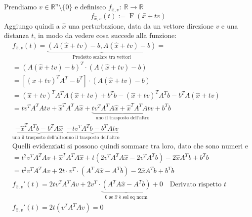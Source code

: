 \documentclass{article}
\begin{document}
Prendiamo $v\in \mathbb R^n\setminus\{0\}$ e definisco $f_{\widehat{x},v}:\ \mathbb R\to\mathbb R$
\[f_{\widehat{x},v}(t):=\operatorname{F}(\widehat{x}+tv)\]
Aggiungo quindi a $\widehat{x}$ una perturbazione, data da un vettore direzione $v$ e una distanza $t$, in modo da vedere cosa succede alla funzione:
\begin{align*}
     & f_{\widehat{x},v}(t)=\underbrace{\left(A\left(\widehat{x}+tv\right)-b, A\left(\widehat{x}+tv\right)-b\right)}_{\text{Prodotto scalare tra vettori}}=                    \\
     & =\left(A\left(\widehat{x}+tv\right)-b\right)^T\cdot\left(A\left(\widehat{x}+tv\right)-b\right)                                                                          \\
     & =\left[\left(\widehat{x}+tv\right)^TA^T-b^T\right]\cdot\left(A\left(\widehat{x}+tv\right)-b\right)                                                                      \\
     & =\left(\widehat{x}+tv\right)^TA^TA\left(\widehat{x}+tv\right)+b^Tb-\left(\widehat{x}+tv\right)^TA^Tb-b^TA\left(\widehat{x}+tv\right)                                    \\
     & =tv^TA^TAtv+\widehat{x}^TA^TA\widehat{x}+\underbrace{tv^TA^TA\widehat{x}+\widehat{x}^TA^TAtv}_{\text{uno il trasposto dell'altro}}+b^Tb                                 \\
     & \underbrace{-\widehat{x}^TA^Tb-b^TA\widehat{x}}_{\text{uno il trasposto dell'altro}}\underbrace{-tv^TA^Tb-b^TAtv}_{\text{uno il trasposto dell'altro}}                  \\
     & \text{Quelli evidenziati si possono quindi sommare tra loro, dato che sono numeri e sono equivalenti}                                                                   \\
     & =t^2v^TA^TAv+\widehat{x}^TA^TA\widehat{x}+t\left(2v^TA^TA\widehat{x}-2v^TA^Tb\right)-2\widehat{x}A^Tb+b^Tb                                                              \\
     & =t^2v^TA^TAv+2t\cdot v^T\cdot\left(A^TA\widehat{x}-A^Tb\right)-2\widehat{x}A^Tb+b^Tb                                                                                    \\
     & f_{\widehat{x},v}'(t)=2tv^TA^TAv+2v^T\cdot\underbrace{\left(A^TA\widehat{x}-A^Tb\right)}_{\text{$0$ se $\widehat{x}$ è sol eq norm}}+0\quad\text{Derivato rispetto $t$} \\
     & f_{\widehat{x},v}'(t)=2t\left(v^TA^TAv\right)=0
\end{align*}
\end{document}
